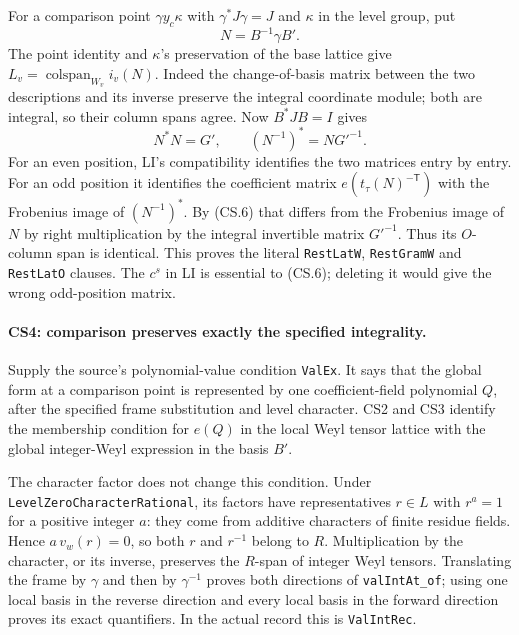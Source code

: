 For a comparison point $\gamma y_c\kappa$ with $\gamma^*J\gamma=J$
and $\kappa$ in the level group, put
\[
 N=B^{-1}\gamma B'.
\]
The point identity and $\kappa$'s preservation of the base lattice give
$L_v=\operatorname{colspan}_{W_v}i_v(N)$.
Indeed the change-of-basis matrix between the two descriptions and its
inverse preserve the integral coordinate module; both are integral,
so their column spans agree. Now $B^*JB=I$ gives
\[
 N^*N=G',\qquad (N^{-1})^*=NG'^{-1}.                    \tag{CS.6}
\]
For an even position, LI's compatibility identifies the two matrices
entry by entry. For an odd position it identifies the coefficient
matrix $e(t_\tau(N)^{-\mathsf T})$ with the Frobenius image of
$(N^{-1})^*$. By (CS.6) that differs from the Frobenius image of $N$
by right multiplication by the integral invertible matrix $G'^{-1}$.
Thus its $O$-column span is identical. This proves the literal
\texttt{RestLatW}, \texttt{RestGramW} and \texttt{RestLatO} clauses.
The $c^s$ in LI is essential to (CS.6); deleting it would give the
wrong odd-position matrix.

\paragraph{CS4: comparison preserves exactly the specified integrality.}
Supply the source's polynomial-value condition \texttt{ValEx}.
It says that the global form at a comparison point is represented by
one coefficient-field polynomial $Q$, after the specified frame
substitution and level character. CS2 and CS3 identify the membership
condition for $e(Q)$ in the local Weyl tensor lattice with the global
integer-Weyl expression in the basis $B'$.

The character factor does not change this condition. Under
\texttt{LevelZeroCharacterRational}, its factors have representatives
$r\in L$ with $r^a=1$ for a positive integer $a$: they come from
additive characters of finite residue fields. Hence
$a\,v_w(r)=0$, so both $r$ and $r^{-1}$ belong to $R$.
Multiplication by the character, or its inverse, preserves the
$R$-span of integer Weyl tensors. Translating the frame by
$\gamma$ and then by $\gamma^{-1}$ proves both directions of
\texttt{valIntAt\_of}; using one local basis in the reverse direction
and every local basis in the forward direction proves its exact
quantifiers. In the actual record this is \texttt{ValIntRec}.

